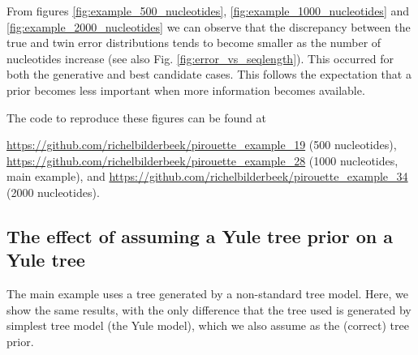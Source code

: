 From figures \ref{fig:example_500_nucleotides}, 
\ref{fig:example_1000_nucleotides} and \ref{fig:example_2000_nucleotides} 
we can observe that the discrepancy between the true and twin error 
distributions tends to become smaller as the number of nucleotides increase (see also Fig. \ref{fig:error_vs_seqlength}).
This occurred for both the generative and best candidate cases.
This follows the expectation that a prior becomes less important when
more information becomes available.

The code to reproduce these figures can be found at  
\begin{sloppypar}
  \url{https://github.com/richelbilderbeek/pirouette_example_19} (500 nucleotides),
  \url{https://github.com/richelbilderbeek/pirouette_example_28} (1000 nucleotides, main example),
  and \url{https://github.com/richelbilderbeek/pirouette_example_34} (2000 nucleotides).
\end{sloppypar}

\newpage

\subsection{The effect of assuming a Yule tree prior on a Yule tree}
\label{subsec:simplest_correct_parameterization}

The main example uses a tree generated by a non-standard tree model.
Here, we show the same results, with the only difference that
the tree used is generated by simplest tree model (the Yule model),
which we also assume as the (correct) tree prior.

